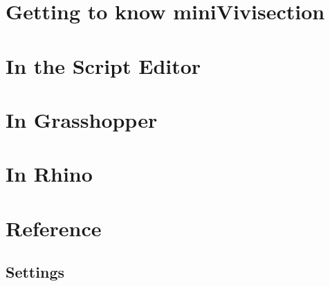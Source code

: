 \documentclass[a4paper, 10.5pt, oneside, open=any, parskip=false, numbers=noenddot, toc=flat]{scrbook}
\begin{document}
\frontmatter

\tableofcontents

\mainmatter
\part{Getting to know miniVivisection}





\part{In the Script Editor}









\part{In Grasshopper}






\part{In Rhino}



\part{Reference}


\chapter{Settings}\label{ch:settings}



\end{document}

